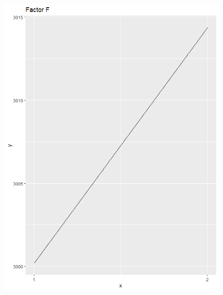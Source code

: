 \begin{figure}[H]
\begin{minipage}[b]{0.33\linewidth}
		\includegraphics[width=1\linewidth]{simulations/taguchi/plots/main_effect_f} 
	\end{minipage}
	

\end{figure}
